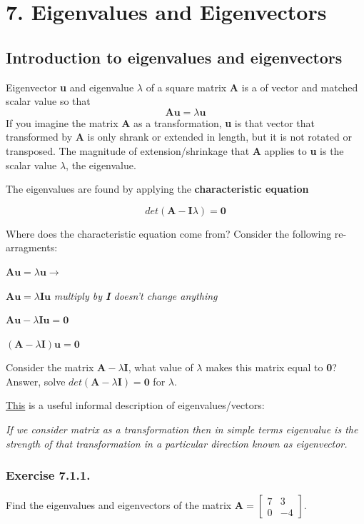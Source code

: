 \section{7. Eigenvalues and Eigenvectors}

\subsection{Introduction to eigenvalues and eigenvectors}

Eigenvector \textbf{u} and eigenvalue $\lambda$ of a square matrix \textbf{A} is a 
of vector and matched scalar value so that
$$\mathbf{Au} = \lambda\mathbf{u}
$$
If you imagine the matrix \textbf{A} as a transformation, \textbf{u} is that vector that transformed
by \textbf{A} is only shrank or extended in length, but it is not rotated or transposed.
The magnitude of extension/shrinkage that \textbf{A} applies to \textbf{u} is the
scalar value $\lambda$, the eigenvalue.

The eigenvalues are found by applying the \textbf{characteristic equation}

$$
det(\mathbf{A - I}\lambda) = \mathbf{0}
$$

Where does the characteristic equation come from? Consider the following re-arragments:

$\mathbf{Au} = \lambda\mathbf{u} \rightarrow$

$\mathbf{Au} = \lambda\mathbf{Iu}$ \emph{multiply by \textbf{I} doesn't change anything}

$\mathbf{Au} - \lambda\mathbf{Iu} = \mathbf{0}$

$(\mathbf{A} - \lambda\mathbf{I})\mathbf{u} = \mathbf{0}$ 

Consider the matrix $\mathbf{A} - \lambda\mathbf{I}$, what value of $\lambda$ makes
this matrix equal to \textbf{0}? Answer, solve $det(\mathbf{A} - \lambda\mathbf{I}) = \mathbf{0}$
for $\lambda$.

\href{http://www.researchgate.net/post/What_is_the_physical_significance_of_eigenvalues_or_eigenvectors_Please_try_to_explain_in_very_simple_language}
{This} is a useful informal description of eigenvalues/vectors:

\emph{If we consider matrix as a transformation then in simple terms eigenvalue is the
strength of that transformation in a particular direction known as eigenvector.}

\subsubsection{Exercise 7.1.1.}
Find the eigenvalues and eigenvectors of the matrix
$\mathbf{A} = \left[\begin{matrix}7 & 3\\0 & -4\end{matrix}\right]$.

